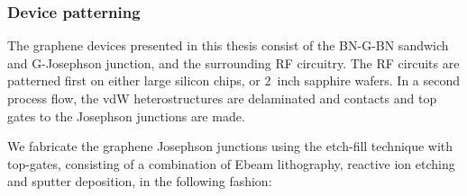 \subsubsection{Device patterning}

The graphene devices presented in this thesis consist of the BN-G-BN sandwich and G-Josephson junction, and the surrounding RF circuitry.
%
The RF circuits are patterned first on either large silicon chips, or \SI{2}{inch} sapphire wafers.
%
In a second process flow, the vdW heterostructures are delaminated and contacts and top gates to the Josephson junctions are made.

We fabricate the graphene Josephson junctions using the etch-fill technique with top-gates, consisting of a combination of Ebeam lithography, reactive ion etching and sputter deposition, in the following fashion:


